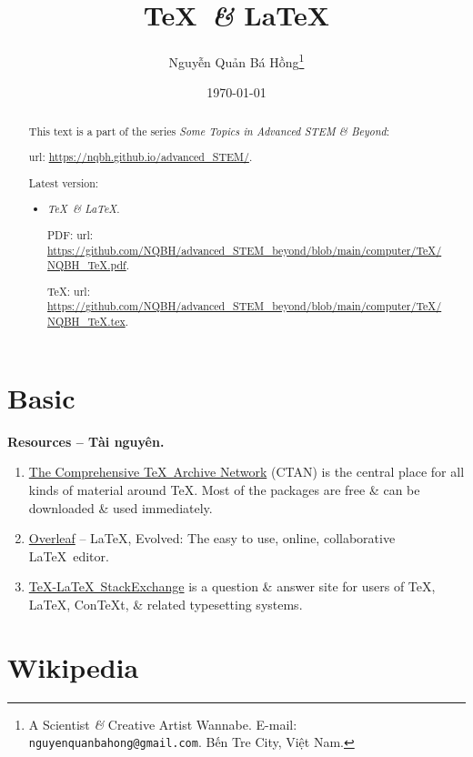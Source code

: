 \documentclass{article}
\title{\TeX\ {\it\&} \LaTeX}
\author{Nguyễn Quản Bá Hồng\footnote{A Scientist {\it\&} Creative Artist Wannabe. E-mail: {\tt nguyenquanbahong@gmail.com}. Bến Tre City, Việt Nam.}}
\date{\today}
\begin{document}
\maketitle
\begin{abstract}
	This text is a part of the series {\it Some Topics in Advanced STEM \& Beyond}:
	
	{\sc url}: \url{https://nqbh.github.io/advanced_STEM/}.
	
	Latest version:
	\begin{itemize}
		\item {\it \TeX\ \& \LaTeX}.
		
		PDF: {\sc url}: \url{https://github.com/NQBH/advanced_STEM_beyond/blob/main/computer/TeX/NQBH_TeX.pdf}.
		
		\TeX: {\sc url}: \url{https://github.com/NQBH/advanced_STEM_beyond/blob/main/computer/TeX/NQBH_TeX.tex}.
	\end{itemize}
\end{abstract}
\tableofcontents


\section{Basic}
\textbf{\textsf{Resources -- Tài nguyên.}}
\begin{enumerate}
	\item \href{https://ctan.org/}{The Comprehensive \TeX\ Archive Network} (CTAN) is the central place for all kinds of material around \TeX. Most of the packages are free \& can be downloaded \& used immediately.
	\item \href{https://www.overleaf.com/}{Overleaf} -- \LaTeX, Evolved: The easy to use, online, collaborative \LaTeX\ editor.
	\item \href{https://tex.stackexchange.com/}{\TeX-\LaTeX\ StackExchange} is a question \& answer site for users of \TeX, \LaTeX, ConTeXt, \& related typesetting systems.
\end{enumerate}


\section{Wikipedia}

\end{document}

